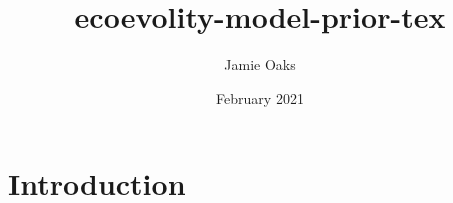 \documentclass{article}
\title{ecoevolity-model-prior-tex}
\author{Jamie Oaks}
\date{February 2021}
\begin{document}
\maketitle

\section{Introduction}
\end{document}

